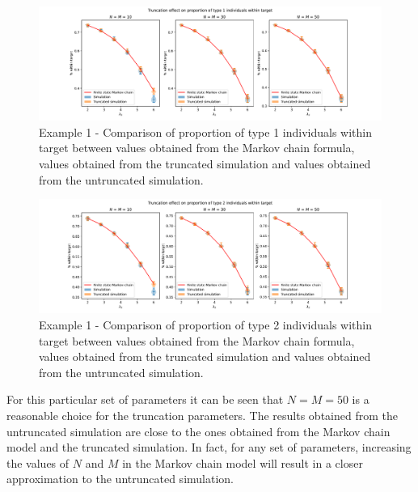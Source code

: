 \begin{figure}[H]
    \includegraphics[width=\textwidth]{chapters/03_queueing_model/Bin/numeric_results_and_timings/truncation_effect/proportion_type_1.pdf}
    \caption{
        Example 1 - Comparison of proportion of type 1 individuals within
        target between values
        obtained from the Markov chain formula, values obtained from the
        truncated simulation and values obtained from the untruncated
        simulation.
    }
    \label{fig:markov_vs_des_proportion_within_time_comparison_type_1}
\end{figure}

\begin{figure}[H]
    \includegraphics[width=\textwidth]{chapters/03_queueing_model/Bin/numeric_results_and_timings/truncation_effect/proportion_type_2.pdf}
    \caption{
        Example 1 - Comparison of proportion of type 2 individuals within
        target between values
        obtained from the Markov chain formula, values obtained from the
        truncated simulation and values obtained from the untruncated
        simulation.
    }
    \label{fig:markov_vs_des_proportion_within_time_comparison_type_2}
\end{figure}

For this particular set of parameters it can be seen that \(N=M=50\) is a
reasonable choice for the truncation parameters.
The results obtained from the untruncated simulation are close to the ones
obtained from the Markov chain model and the truncated simulation.
In fact, for any set of parameters, increasing the values of \(N\) and \(M\) in
the Markov chain model will result in a closer approximation to the untruncated
simulation.

